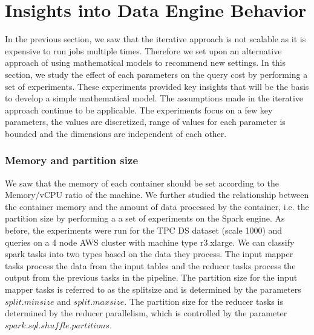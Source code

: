 \section{Insights into Data Engine Behavior}
\label{sec:insights}
In the previous section, we saw that the iterative approach is not scalable as it is expensive to run jobs multiple times. Therefore we set upon an alternative approach of using mathematical models to recommend new settings. In this section, we study the effect of each parameters on the query cost by performing a set of experiments. These experiments provided key insights that will be the basis to develop a simple mathematical model. 
The assumptions made in the iterative approach continue to be applicable. The experiments focus on a few key parameters, the values are discretized, range of values for each parameter is bounded and the dimensions are independent of each other. 



\subsubsection*{Memory and partition size}
We saw that the memory of each container should be set according to the Memory/vCPU ratio of the machine. We further studied the relationship between the container memory and the amount of data processed by the container, i.e. the partition size by performing a a set of experiments on the Spark engine. As before, the experiments were run for the TPC DS dataset (scale 1000) and queries on a 4 node AWS cluster with machine type r3.xlarge. We can classify spark tasks into two types based on the data they process. The input mapper tasks process the data from the input tables and the reducer tasks process the output from the previous tasks in the pipeline. The partition size for the input mapper tasks is referred to as the splitsize and is determined by the parameters %
$split.minsize$ and %
$split.maxsize$. The partition size for the reducer tasks is determined by the reducer parallelism, which is controlled by the parameter $spark.sql.shuffle.partitions$. 

